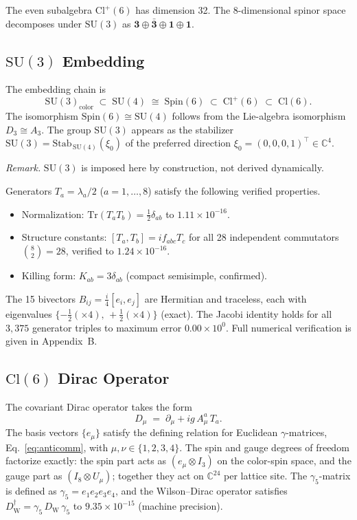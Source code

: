 \documentclass[12pt]{article}
\newcommand{\cl}{\mathrm{Cl}}          %
\newcommand{\spin}{\mathrm{Spin}}
\newcommand{\su}{\mathrm{SU}}
\newcommand{\tr}{\mathrm{Tr}}
\newcommand{\dW}{D_{\mathrm{W}}}       %
\begin{document}
The even subalgebra $\cl^+(6)$ has dimension 32.  The 8-dimensional
spinor space decomposes under $\su(3)$ as
$\mathbf{3}\oplus\bar{\mathbf{3}}\oplus\mathbf{1}\oplus\mathbf{1}$.

\subsection{\texorpdfstring{$\su(3)$}{SU(3)} Embedding}
\label{sec:su3embed}

The embedding chain is
\[
  \su(3)_{\text{color}} \;\subset\; \su(4) \;\cong\; \spin(6)
  \;\subset\; \cl^+(6) \;\subset\; \cl(6).
\]
The isomorphism $\spin(6)\cong\su(4)$ follows from the Lie-algebra
isomorphism $D_3\cong A_3$.  The group $\su(3)$ appears as the
stabilizer
$\su(3) = \mathrm{Stab}_{\,\su(4)}(\xi_0)$
of the preferred direction $\xi_0=(0,0,0,1)^\top\in\mathbb{C}^4$.

\smallskip
\noindent\textit{Remark.}\enspace
$\su(3)$ is imposed here by construction, not derived dynamically.

\smallskip
Generators $T_a = \lambda_a/2$ ($a=1,\ldots,8$) satisfy the following
verified properties.
\begin{itemize}
  \item Normalization: $\tr(T_a T_b) = \tfrac{1}{2}\delta_{ab}$ to
        $1.11\times10^{-16}$.
  \item Structure constants: $[T_a,T_b] = if_{abc}T_c$ for all 28
        independent commutators $\binom{8}{2}=28$, verified to
        $1.24\times10^{-16}$.
  \item Killing form: $K_{ab} = 3\delta_{ab}$ (compact semisimple,
        confirmed).
\end{itemize}
The 15 bivectors $B_{ij}=\tfrac{i}{4}[e_i,e_j]$ are Hermitian and
traceless, each with eigenvalues $\{-\tfrac{1}{2}(\times 4),\,
+\tfrac{1}{2}(\times 4)\}$ (exact).  The Jacobi identity holds for all
$3{,}375$ generator triples to maximum error $0.00\times10^{0}$.
Full numerical verification is given in Appendix~B.

\subsection{\texorpdfstring{$\cl(6)$}{Cl(6)} Dirac Operator}
\label{sec:dirac-op}

The covariant Dirac operator takes the form
\begin{equation}
  D_\mu \;=\; \partial_\mu + ig\,A_\mu^a\,T_a.
  \label{eq:dirac-cov}
\end{equation}
The basis vectors $\{e_\mu\}$ satisfy the defining relation for
Euclidean $\gamma$-matrices, Eq.~\eqref{eq:anticomm}, with
$\mu,\nu\in\{1,2,3,4\}$.  The spin and gauge degrees of freedom
factorize exactly: the spin part acts as $(e_\mu\otimes I_3)$ on the
color-spin space, and the gauge part as $(I_8\otimes U_\mu)$; together
they act on $\mathbb{C}^{24}$ per lattice site.  The
$\gamma_5$-matrix is defined as
$\gamma_5 = e_1 e_2 e_3 e_4$,
and the Wilson--Dirac operator satisfies
$\dW^\dagger = \gamma_5\,\dW\,\gamma_5$
to $9.35\times10^{-15}$ (machine precision).
\end{document}
